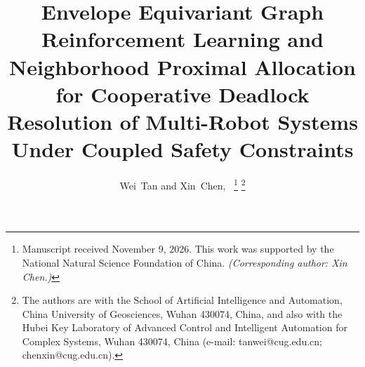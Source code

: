 \documentclass[journal]{IEEEtran}
\begin{document}
\title{Envelope Equivariant Graph Reinforcement Learning and Neighborhood Proximal Allocation for Cooperative Deadlock Resolution of Multi-Robot Systems Under Coupled Safety Constraints}

\author{Wei~Tan and Xin~Chen,~%
\thanks{Manuscript received November 9, 2026. This work was supported by the National Natural Science Foundation of China. \textit{(Corresponding author: Xin Chen.)}}%
\thanks{The authors are with the School of Artificial Intelligence and Automation, China University of Geosciences, Wuhan 430074, China, and also with the Hubei Key Laboratory of Advanced Control and Intelligent Automation for Complex Systems, Wuhan 430074, China (e-mail: tanwei@cug.edu.cn; chenxin@cug.edu.cn).}%
}


\maketitle
\end{document}
